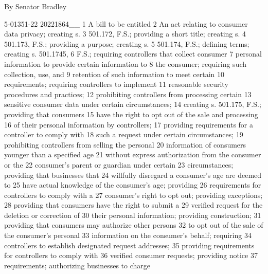  By Senator Bradley
       
       
       
       
       
       5-01351-22                                            20221864__
    1                        A bill to be entitled                      
    2         An act relating to consumer data privacy; creating s.
    3         501.172, F.S.; providing a short title; creating s.
    4         501.173, F.S.; providing a purpose; creating s.
    5         501.174, F.S.; defining terms; creating s. 501.1745,
    6         F.S.; requiring controllers that collect consumer
    7         personal information to provide certain information to
    8         the consumer; requiring such collection, use, and
    9         retention of such information to meet certain
   10         requirements; requiring controllers to implement
   11         reasonable security procedures and practices;
   12         prohibiting controllers from processing certain
   13         sensitive consumer data under certain circumstances;
   14         creating s. 501.175, F.S.; providing that consumers
   15         have the right to opt out of the sale and processing
   16         of their personal information by controllers;
   17         providing requirements for a controller to comply with
   18         such a request under certain circumstances;
   19         prohibiting controllers from selling the personal
   20         information of consumers younger than a specified age
   21         without express authorization from the consumer or the
   22         consumer’s parent or guardian under certain
   23         circumstances; providing that businesses that
   24         willfully disregard a consumer’s age are deemed to
   25         have actual knowledge of the consumer’s age; providing
   26         requirements for controllers to comply with a
   27         consumer’s right to opt out; providing exceptions;
   28         providing that consumers have the right to submit a
   29         verified request for the deletion or correction of
   30         their personal information; providing construction;
   31         providing that consumers may authorize other persons
   32         to opt out of the sale of the consumer’s personal
   33         information on the consumer’s behalf; requiring
   34         controllers to establish designated request addresses;
   35         providing requirements for controllers to comply with
   36         verified consumer requests; providing notice
   37         requirements; authorizing businesses to charge

